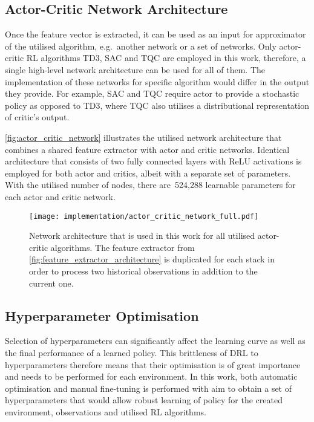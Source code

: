\subsection{Actor-Critic Network Architecture}

Once the feature vector is extracted, it can be used as an input for approximator of the utilised algorithm, e.g.~another network or a set of networks. Only actor-critic RL algorithms TD3, SAC and TQC are employed in this work, therefore, a single high-level network architecture can be used for all of them. The implementation of these networks for specific algorithm would differ in the output they provide. For example, SAC and TQC require actor to provide a stochastic policy as opposed to TD3, where TQC also utilises a distributional representation of critic's output.

\autoref{fig:actor_critic_network} illustrates the utilised network architecture that combines a shared feature extractor with actor and critic networks. Identical architecture that consists of two fully connected layers with ReLU activations is employed for both actor and critics, albeit with a separate set of parameters. With the utilised number of nodes, there are~524,288 learnable parameters for each actor and critic network.

\begin{figure}[ht]
    \centering
    \texttt{[image: implementation/actor\_critic\_network\_full.pdf]}
    \caption{Network architecture that is used in this work for all utilised actor-critic algorithms. The feature extractor from \protect\autoref{fig:feature_extractor_architecture} is duplicated for each stack in order to process two historical observations in addition to the current one.}
    \label{fig:actor_critic_network}
\end{figure}


\subsection{Hyperparameter Optimisation}

Selection of hyperparameters can significantly affect the learning curve as well as the final performance of a learned policy. This brittleness of DRL to hyperparameters therefore means that their optimisation is of great importance and needs to be performed for each environment. In this work, both automatic optimisation and manual fine-tuning is performed with aim to obtain a set of hyperparameters that would allow robust learning of policy for the created environment, observations and utilised RL algorithms.

